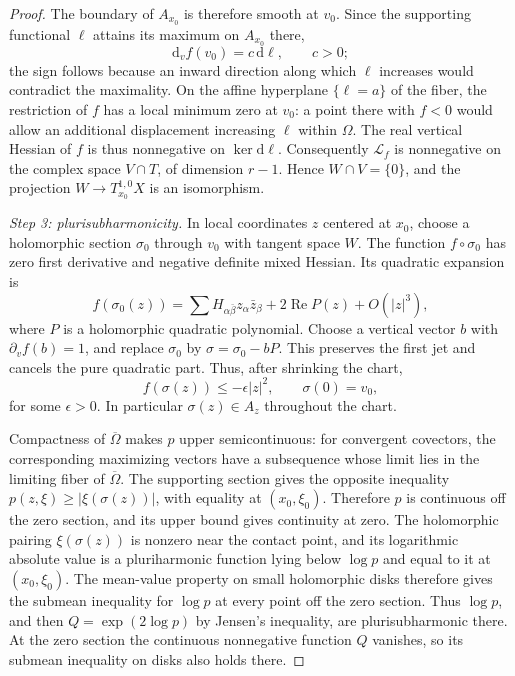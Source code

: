 \begin{proof}
The boundary of $A_{x_0}$ is therefore smooth at $v_0$. Since the supporting functional $\ell$ attains its maximum on $A_{x_0}$ there,
\[
 \mathrm d_vf(v_0)=c\,\mathrm d\ell,\qquad c>0;
\]
the sign follows because an inward direction along which $\ell$ increases would contradict the maximality. On the affine hyperplane $\{\ell=a\}$ of the fiber, the restriction of $f$ has a local minimum zero at $v_0$: a point there with $f<0$ would allow an additional displacement increasing $\ell$ within $\Omega$. The real vertical Hessian of $f$ is thus nonnegative on $\ker\mathrm d\ell$. Consequently $\mathcal L_f$ is nonnegative on the complex space $V\cap T$, of dimension $r-1$. Hence $W\cap V=\{0\}$, and the projection $W\to T^{1,0}_{x_0}X$ is an isomorphism.

\emph{Step 3: plurisubharmonicity.} In local coordinates $z$ centered at $x_0$, choose a holomorphic section $\sigma_0$ through $v_0$ with tangent space $W$. The function $f\circ\sigma_0$ has zero first derivative and negative definite mixed Hessian. Its quadratic expansion is
\[
 f(\sigma_0(z))=\sum H_{\alpha\bar\beta}z_\alpha\bar z_\beta
                    +2\operatorname{Re}P(z)+O(|z|^3),
\]
where $P$ is a holomorphic quadratic polynomial. Choose a vertical vector $b$ with $\partial_vf(b)=1$, and replace $\sigma_0$ by $\sigma=\sigma_0-bP$. This preserves the first jet and cancels the pure quadratic part. Thus, after shrinking the chart,
\[
 f(\sigma(z))\leq-\epsilon|z|^2,
 \qquad \sigma(0)=v_0,
\]
for some $\epsilon>0$. In particular $\sigma(z)\in A_z$ throughout the chart.

Compactness of $\overline\Omega$ makes $p$ upper semicontinuous: for convergent covectors, the corresponding maximizing vectors have a subsequence whose limit lies in the limiting fiber of $\overline\Omega$. The supporting section gives the opposite inequality $p(z,\xi)\geq|\xi(\sigma(z))|$, with equality at $(x_0,\xi_0)$. Therefore $p$ is continuous off the zero section, and its upper bound gives continuity at zero. The holomorphic pairing $\xi(\sigma(z))$ is nonzero near the contact point, and its logarithmic absolute value is a pluriharmonic function lying below $\log p$ and equal to it at $(x_0,\xi_0)$. The mean-value property on small holomorphic disks therefore gives the submean inequality for $\log p$ at every point off the zero section. Thus $\log p$, and then $Q=\exp(2\log p)$ by Jensen's inequality, are plurisubharmonic there. At the zero section the continuous nonnegative function $Q$ vanishes, so its submean inequality on disks also holds there.


\end{proof}
